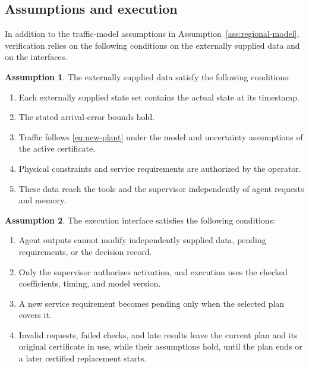 \documentclass[final]{cas-sc}
\theoremstyle{definition}
\newtheorem{assumption}{Assumption}
\theoremstyle{plain}
\theoremstyle{definition}
\theoremstyle{plain}
\begin{document}
\subsection{Assumptions and execution}
\label{sec:execution-interface}

In addition to the traffic-model assumptions in
Assumption~\ref{ass:regional-model}, verification relies on the
following conditions on the externally supplied data and on the
interfaces.

\begin{assumption}
\label{ass:trusted-inputs}
The externally supplied data satisfy the following conditions:
\begin{enumerate}
\renewcommand{\labelenumi}{(\alph{enumi})}
\item Each externally supplied state set contains the actual state at
its timestamp.
\item The stated arrival-error bounds hold.
\item Traffic follows \eqref{eq:new-plant} under the
model and uncertainty assumptions of the active certificate.
\item Physical constraints and service requirements are authorized by
the operator.
\item These data reach the tools and the supervisor independently of
agent requests and memory.
\end{enumerate}
\end{assumption}

\begin{assumption}
\label{ass:supervisory-separation}
The execution interface satisfies the following conditions:
\begin{enumerate}
\renewcommand{\labelenumi}{(\alph{enumi})}
\item Agent outputs cannot modify independently supplied data, pending
requirements, or the decision record.
\item Only the supervisor authorizes activation, and execution uses
the checked coefficients, timing, and model version.
\item A new service requirement becomes pending only when the selected
plan covers it.
\item Invalid requests, failed checks, and late results leave the
current plan and its original certificate in use, while their
assumptions hold, until the plan ends or a later certified replacement
starts.
\end{enumerate}
\end{assumption}
\end{document}
